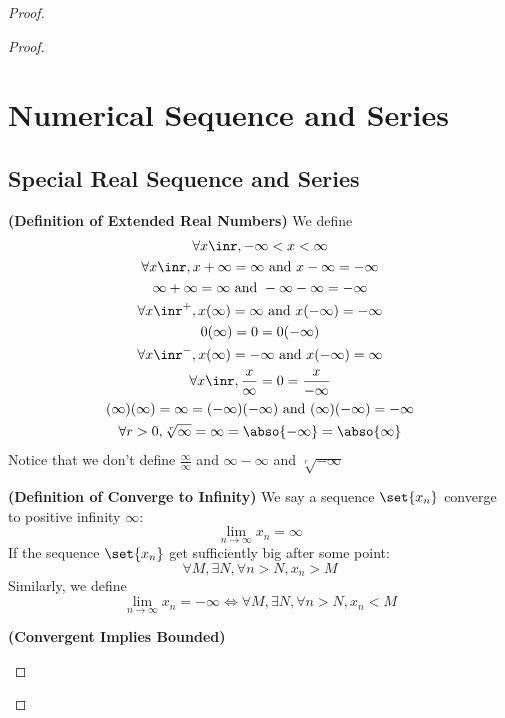 \documentclass{report}
\begin{document}
\begin{proof}
\begin{proof}
\chapter{Numerical Sequence and Series}
\section{Special Real Sequence and Series}
\begin{definition}
\label{4.1.1}
\textbf{(Definition of Extended Real Numbers)} We define
\begin{gather}
\forall x\inr, -\infty <x<\infty\\
\forall x\inr, x+\infty=\infty \text{ and }x-\infty=-\infty\\
\infty+\infty=\infty \text{ and }-\infty-\infty=-\infty\\
\forall x\inr^+, x(\infty)=\infty \text{ and }x(-\infty)=-\infty\\
0(\infty)=0=0(-\infty)\\
\forall x\inr^-, x(\infty)=-\infty\text{ and }x(-\infty)=\infty\\
\forall x\inr, \frac{x}{\infty}=0=\frac{x}{-\infty}\\
  (\infty)(\infty)=\infty=(-\infty)(-\infty)\text{ and }(\infty)(-\infty)=-\infty\\
  \forall r>0, \sqrt[r]{\infty}=\infty=\abso{-\infty}= \abso{\infty}
\end{gather}
Notice that we don't define  $\frac{\infty}{\infty}$ and $\infty-\infty$ and $\sqrt[r]{-\infty} $
\end{definition}
\begin{definition}
\label{4.1.2}
\textbf{(Definition of Converge to Infinity)} We say a sequence $\set{x_n}$ converge to positive infinity $\infty$:
\begin{equation}
\lim_{n\to\infty} x_n=\infty
\end{equation}
If the sequence $\set{x_n}$ get sufficiently big after some point:
 \begin{equation}
\forall M, \exists N, \forall n>N, x_n>M
\end{equation}
Similarly, we define
\begin{equation}
\lim_{n\to\infty}x_n=-\infty\iff \forall M, \exists N, \forall n>N, x_n<M
\end{equation}
\end{definition}
\begin{theorem}
\label{4.1.3}
\textbf{(Convergent Implies Bounded)} 
\begin{equation}

\end{equation}
\end{theorem}
\end{proof}
\end{proof}
\end{document}
